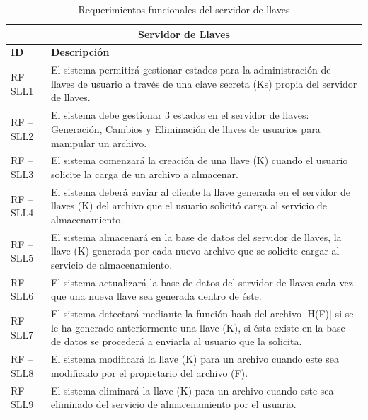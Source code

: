 \begin{table}[htb]
\centering
\begin{tabular}{| p{2cm} |  p{13.5cm} |}
\hline
\multicolumn{2}{|c|}{\textbf{Servidor de Llaves}} \\ \hline
\textbf{ID} &  \textbf{Descripción} \\
\hline \hline
RF – SLL1 & El sistema permitirá gestionar estados para la administración de llaves de usuario a través de una clave secreta (Ks) propia del servidor de llaves. \\ \hline
RF – SLL2 & El sistema debe gestionar 3 estados en el servidor de llaves: Generación, Cambios y Eliminación de llaves de usuarios para manipular un archivo. \\ \hline
RF – SLL3 & El sistema comenzará la creación de una llave (K) cuando el usuario solicite la carga de un archivo a almacenar. \\ \hline
RF – SLL4 & El sistema deberá enviar al cliente la llave generada en el servidor de llaves (K) del archivo que el usuario solicitó carga al servicio de almacenamiento. \\ \hline
RF – SLL5 & El sistema almacenará en la base de datos del servidor de llaves, la llave (K) generada por cada nuevo archivo que se solicite cargar al servicio de almacenamiento. \\ \hline
RF – SLL6 & El sistema actualizará la base de datos del servidor de llaves cada vez que una nueva llave sea generada dentro de éste. \\ \hline
RF – SLL7 & El sistema detectará mediante la función hash del archivo [H(F)] si se le ha generado anteriormente una llave (K), si ésta existe en la base de datos se procederá a enviarla al usuario que la solicita. \\ \hline
RF – SLL8 & El sistema modificará la llave (K) para un archivo cuando este sea modificado por el propietario del archivo (F). \\ \hline
RF – SLL9 & El sistema eliminará la llave (K) para un archivo cuando este sea eliminado del servicio de almacenamiento por el usuario. \\ \hline
\end{tabular}
\caption{Requerimientos funcionales del servidor de llaves}
\label{Servidor de Llaves }
\end{table}


